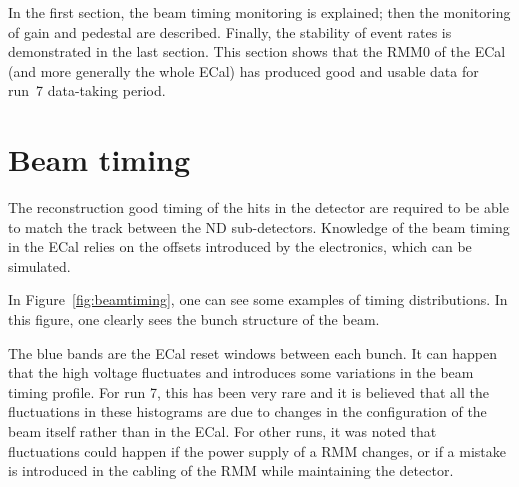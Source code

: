 In the first section, the beam timing monitoring is explained; then
the monitoring of gain and pedestal are described. Finally, the
stability of event rates is demonstrated in the last section. This
section shows that the \Gls{RMM}0 of the \Gls{ECal} (and more
generally the whole \Gls{ECal}) has produced good and usable data for
run~7 data-taking period.


\section{Beam timing}
\label{sec:beamtiming}

The reconstruction good timing of the hits in the detector are
required to be able to match the track between the \Gls{ND}
sub-detectors. Knowledge of the beam timing in the \Gls{ECal} relies
on the offsets introduced by the electronics, which can be simulated.

In Figure~\ref{fig:beamtiming}, one can see some examples of timing
distributions. In this figure, one clearly sees the bunch structure of
the beam.

The blue bands are the \Gls{ECal} reset windows between each bunch. It
can happen that the high voltage fluctuates and introduces some
variations in the beam timing profile. For run 7, this has been very
rare and it is believed that all the fluctuations in these histograms
are due to changes in the configuration of the beam itself rather than
in the \Gls{ECal}. For other runs, it was noted that fluctuations
could happen if the power supply of a \Gls{RMM} changes, or if a
mistake is introduced in the cabling of the \Gls{RMM} while
maintaining the detector.

